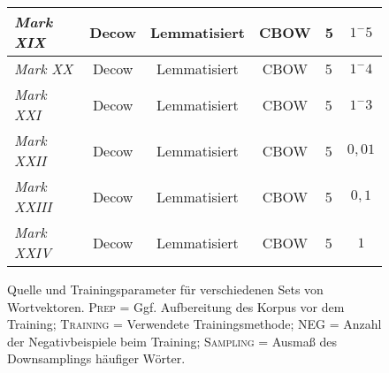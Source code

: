 \begin{figure}[h]
\begin{tabular}{l||c|c|c|l|c}
  \hline
  \emph{Mark XIX} & Decow & Lemmatisiert & CBOW & 5 & $1^-5$ \\
  \hline
  \emph{Mark XX} & Decow & Lemmatisiert & CBOW & 5 & $1^-4$ \\
  \hline
  \emph{Mark XXI} & Decow & Lemmatisiert & CBOW & 5 & $1^-3$ \\
  \hline
  \emph{Mark XXII} & Decow & Lemmatisiert & CBOW & 5 & $0,01$ \\
  \hline
  \emph{Mark XXIII} & Decow & Lemmatisiert & CBOW & 5 & $0,1$ \\
  \hline
  \emph{Mark XXIV} & Decow & Lemmatisiert & CBOW & 5 & $1$ \\
\end{tabular}
\caption[Quelle und Trainingsparameter für Wortvektoren]{Quelle und Trainingsparameter für verschiedenen Sets von Wortvektoren.
\textsc{Prep} = Ggf. Aufbereitung des Korpus vor dem Training; \textsc{Training} = Verwendete Trainingsmethode; \textsc{NEG} = Anzahl der
Negativbeispiele beim Training; \textsc{Sampling} = Ausmaß des Downsamplings häufiger Wörter.}
\end{figure}

